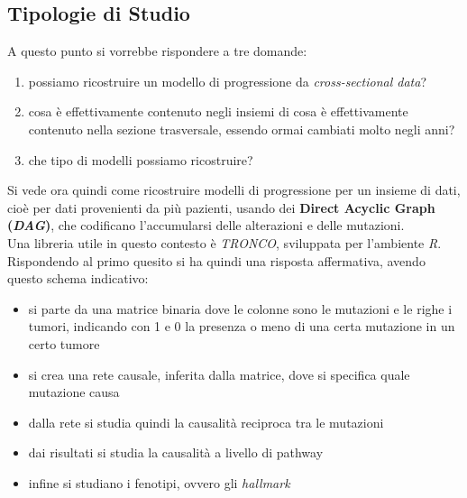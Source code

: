 \documentclass[a4paper,12pt, oneside]{book}
\begin{document}
\subsection{Tipologie di Studio}
A questo punto si vorrebbe rispondere a tre domande:
\begin{enumerate}
  \item possiamo ricostruire un modello di progressione da
  \textit{cross-sectional data}?
  \item cosa è effettivamente contenuto negli insiemi di cosa è effettivamente
  contenuto nella sezione trasversale, essendo ormai cambiati molto negli anni?
  \item che tipo di modelli possiamo ricostruire?
\end{enumerate}
Si vede ora quindi come ricostruire modelli di progressione  per un insieme di
dati, cioè per dati provenienti da più pazienti, usando dei \textbf{Direct
  Acyclic Graph (\textit{DAG})}, che codificano l'accumularsi delle alterazioni
e delle mutazioni. \\
Una libreria utile in questo contesto è \textit{TRONCO}, sviluppata per
l'ambiente \textit{R}. \\
Rispondendo al primo quesito si ha quindi una risposta affermativa, avendo questo
schema indicativo:
\begin{itemize}
  \item si parte da una matrice binaria dove le colonne sono le mutazioni e le
  righe i tumori, indicando con 1 e 0 la presenza o meno di una certa mutazione
  in un certo tumore
  \item si crea una rete causale, inferita dalla matrice, dove si specifica
  quale mutazione causa
  \item dalla rete si studia quindi la causalità reciproca tra le mutazioni
  \item dai risultati si studia la causalità a livello di pathway 
  \item infine si studiano i fenotipi, ovvero gli \textit{hallmark}
\end{itemize}
\end{document}
